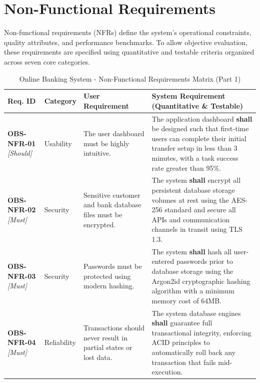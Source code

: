 \documentclass[11pt,a4paper]{article}
\begin{document}
\newpage

\section{Non-Functional Requirements}
Non-functional requirements (NFRs) define the system's operational constraints, quality attributes, and performance benchmarks. To allow objective evaluation, these requirements are specified using quantitative and testable criteria organized across seven core categories.

\begin{table}[H]
\centering
\caption{Online Banking System - Non-Functional Requirements Matrix (Part 1)}
\label{tab:nonfunctional_reqs_1}
\footnotesize
\singlespacing
\begin{tabular}{p{2.0cm} p{2.2cm} p{3.8cm} p{5.4cm}}
\toprule
\textbf{Req. ID} & \textbf{Category} & \textbf{User Requirement} & \textbf{System Requirement (Quantitative \& Testable)} \\ \midrule

\textbf{OBS-NFR-01} \newline \textit{\small [Should]} & Usability & The user dashboard must be highly intuitive. & The application dashboard \textbf{shall} be designed such that first-time users can complete their initial transfer setup in less than 3 minutes, with a task success rate greater than 95\%. \\ \midrule

\textbf{OBS-NFR-02} \newline \textit{\small [Must]} & Security & Sensitive customer and bank database files must be encrypted. & The system \textbf{shall} encrypt all persistent database storage volumes at rest using the AES-256 standard and secure all APIs and communication channels in transit using TLS 1.3. \\ \midrule

\textbf{OBS-NFR-03} \newline \textit{\small [Must]} & Security & Passwords must be protected using modern hashing. & The system \textbf{shall} hash all user-entered passwords prior to database storage using the Argon2id cryptographic hashing algorithm with a minimum memory cost of 64MB. \\ \midrule

\textbf{OBS-NFR-04} \newline \textit{\small [Must]} & Reliability & Transactions should never result in partial states or lost data. & The system database engines \textbf{shall} guarantee full transactional integrity, enforcing ACID principles to automatically roll back any transaction that fails mid-execution. \\ \midrule


\end{tabular}
\end{table}
\end{document}
